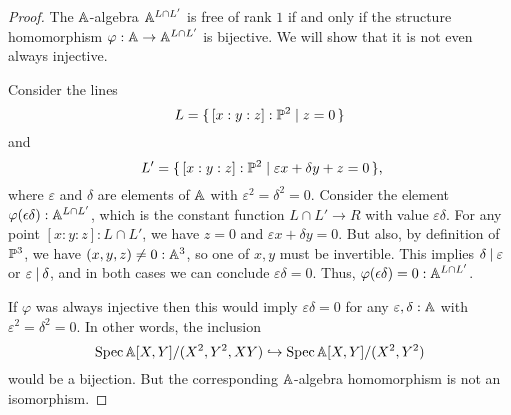 \begin{proof}
  The $\mathbb{A}$-algebra $\mathbb{A}^{L \cap L'}$ is free of rank $1$
  if and only if the structure homomorphism
  $\varphi : \mathbb{A} \to \mathbb{A}^{L \cap L'}$ is bijective.
  We will show that it is not even always injective.

  Consider the lines
  \[ L = \{\, [x : y : z] : \mathbb{P}^2 \mid z = 0 \,\} \]
  and
  \[ L' = \{\, [x : y : z] : \bP^2 \mid \varepsilon x + \delta y + z = 0 \,\}
     \rlap{,} \]
  where $\varepsilon$ and $\delta$ are elements of $\mathbb{A}$
  with $\varepsilon^2 = \delta^2 = 0$.
  Consider the element $\varphi(\epsilon \delta) : \mathbb{A}^{L \cap L'}$,
  which is the constant function $L \cap L' \to R$
  with value $\varepsilon \delta$.
  For any point $[x : y : z] : L \cap L'$,
  we have $z = 0$ and $\varepsilon x + \delta y = 0$.
  But also, by definition of $\mathbb{P}^3$,
  we have $(x, y, z) \neq 0 : \mathbb{A}^3$,
  so one of $x, y$ must be invertible.
  This implies $\delta \mathbin{|} \varepsilon$ or $\varepsilon \mathbin{|} \delta$,
  and in both cases we can conclude $\varepsilon \delta = 0$.
  Thus, $\varphi(\epsilon \delta) = 0 : \mathbb{A}^{L \cap L'}$.

  If $\varphi$ was always injective
  then this would imply $\varepsilon \delta = 0$
  for any $\varepsilon, \delta : \mathbb{A}$
  with $\varepsilon^2 = \delta^2 = 0$.
  In other words, the inclusion
  \[ \operatorname{Spec} \mathbb{A}[X, Y]/(X^2, Y^2, XY) \hookrightarrow \operatorname{Spec} \mathbb{A}[X, Y]/(X^2, Y^2) \]
  would be a bijection.
  But the corresponding $\mathbb{A}$-algebra homomorphism is not an isomorphism.
\end{proof}
